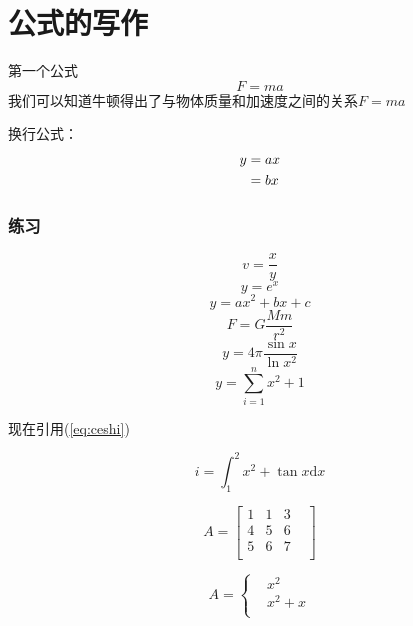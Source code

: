 \documentclass[UTF8]{ctexart}
\begin{document}
	\section{公式的写作}
	第一个公式
	\begin{equation}
		F=ma
	\end{equation}
	我们可以知道牛顿得出了与物体质量和加速度之间的关系$F=ma$
	
	换行公式：
	\begin{align}
		y &=ax\notag\\
		&=bx
	\end{align}
	
	\subsubsection{练习}
	\begin{equation}
		v=\frac{x}{y}
	\end{equation}
	\begin{equation}
		y=e^{x}
	\end{equation}
	\begin{equation}
		y=ax^2+bx+c
	\end{equation}
	\begin{equation}
		F=G\frac{Mm}{r^2}
	\end{equation}
	\begin{equation}
		y=4\pi \frac{\sin{x}}{\ln{x^2}}
	\end{equation}
	\begin{equation}
		\label{eq:ceshi}
		y=\sum^{n}_{i=1} x^2+1
	\end{equation}
	
	现在引用(\ref{eq:ceshi})
	
	\begin{equation}
		i=\int_{1}^{2}x^2+\tan{x}\mathrm{d}x
	\end{equation}
	
	\begin{equation}
		A=\begin{bmatrix}
			1&1&3\\4&5&6\\5&6&7&\\
		\end{bmatrix}
	\end{equation}
	
	\begin{equation}
		A=\begin{cases}
			&x^2\\&x^2+x\\
		\end{cases}
	\end{equation}
	
\end{document}
